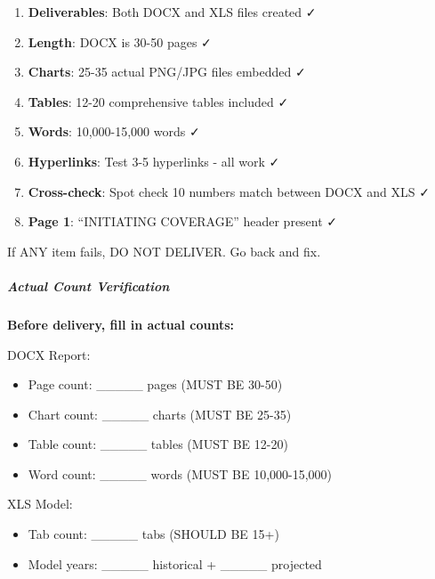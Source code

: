 \documentclass[11pt]{article}
\begin{document}
\begin{enumerate}[leftmargin=*,itemsep=2pt,topsep=2pt]
\item {} \textbf{Deliverables}: Both DOCX and XLS files created ✓
\item {} \textbf{Length}: DOCX is 30-50 pages ✓
\item {} \textbf{Charts}: 25-35 actual PNG/JPG files embedded ✓
\item {} \textbf{Tables}: 12-20 comprehensive tables included ✓
\item {} \textbf{Words}: 10,000-15,000 words ✓
\item {} \textbf{Hyperlinks}: Test 3-5 hyperlinks - all work ✓
\item {} \textbf{Cross-check}: Spot check 10 numbers match between DOCX and XLS ✓
\item {} \textbf{Page 1}: ``INITIATING COVERAGE'' header present ✓
\end{enumerate}

If ANY item fails, DO NOT DELIVER. Go back and fix.


\subparagraph{Actual Count Verification}\mbox{}\par

\textbf{Before delivery, fill in actual counts:}


DOCX Report:

\begin{itemize}[leftmargin=*,itemsep=2pt,topsep=2pt]
\item {} Page count: \_\allowbreak{}\_\allowbreak{}\_\allowbreak{}\_\allowbreak{}\_\allowbreak{} pages (MUST BE 30-50)
\item {} Chart count: \_\allowbreak{}\_\allowbreak{}\_\allowbreak{}\_\allowbreak{}\_\allowbreak{} charts (MUST BE 25-35)
\item {} Table count: \_\allowbreak{}\_\allowbreak{}\_\allowbreak{}\_\allowbreak{}\_\allowbreak{} tables (MUST BE 12-20)
\item {} Word count: \_\allowbreak{}\_\allowbreak{}\_\allowbreak{}\_\allowbreak{}\_\allowbreak{} words (MUST BE 10,000-15,000)
\end{itemize}

XLS Model:

\begin{itemize}[leftmargin=*,itemsep=2pt,topsep=2pt]
\item {} Tab count: \_\allowbreak{}\_\allowbreak{}\_\allowbreak{}\_\allowbreak{}\_\allowbreak{} tabs (SHOULD BE 15+)
\item {} Model years: \_\allowbreak{}\_\allowbreak{}\_\allowbreak{}\_\allowbreak{}\_\allowbreak{} historical + \_\allowbreak{}\_\allowbreak{}\_\allowbreak{}\_\allowbreak{}\_\allowbreak{} projected
\end{itemize}
\end{document}
